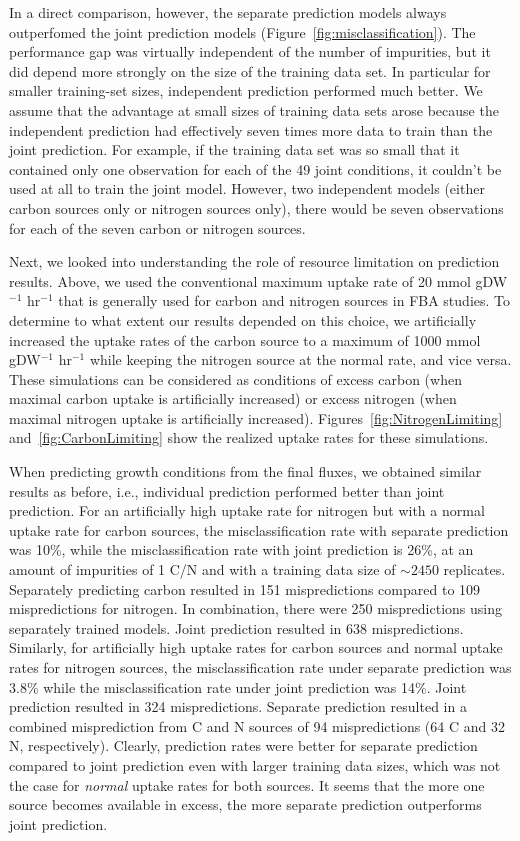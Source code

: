 \documentclass[12pt]{article}
\begin{document}
In a direct comparison, however, the separate prediction models always outperfomed the joint prediction models (Figure~\ref{fig:misclassification}). The performance gap was virtually independent of the number of impurities, but it did depend more strongly on the size of the training data set. In particular for smaller training-set sizes, independent prediction performed much better. We assume that the advantage at small sizes of training data sets arose because the independent prediction had effectively seven times more data to train than the joint prediction. For example, if the training data set was so small that it contained only one observation for each of the 49 joint conditions, it couldn't be used at all to train the joint model. However, two independent models (either carbon sources only or nitrogen sources only), there would be seven observations for each of the seven carbon or nitrogen sources.

Next, we looked into understanding the role of resource limitation on prediction results. Above, we used the conventional maximum uptake rate of 20 mmol gDW$^{-1}$ hr$^{-1}$ that is generally used for carbon and nitrogen sources in FBA studies. To determine to what extent our results depended on this choice, we artificially increased the uptake rates of the carbon source to a maximum of 1000 mmol gDW$^{-1}$ hr$^{-1}$ while keeping the nitrogen source at the normal rate, and vice versa. These simulations can be considered as conditions of excess carbon (when maximal carbon uptake is artificially increased) or excess nitrogen (when maximal nitrogen uptake is artificially increased). Figures~\ref{fig:NitrogenLimiting} and~\ref{fig:CarbonLimiting} show the realized uptake rates for these simulations.

When predicting growth conditions from the final fluxes, we obtained similar results as before, i.e., individual prediction performed better than joint prediction. For an artificially high uptake rate for nitrogen but with a normal uptake rate for carbon sources, the misclassification rate with separate prediction was 10\%, while the  misclassification rate with joint prediction is 26\%, at an amount of impurities of 1 C/N and with a training data size of $\mathord{\sim}2450$ replicates. Separately predicting carbon resulted in 151 mispredictions compared to 109 mispredictions for nitrogen. In combination, there were 250 mispredictions using separately trained models. Joint prediction resulted in 638 mispredictions. Similarly, for artificially high uptake rates for carbon sources and normal uptake rates for nitrogen sources, the misclassification rate under separate prediction was 3.8\% while the misclassification rate under joint prediction was 14\%. Joint prediction resulted in 324 mispredictions. Separate prediction resulted in a combined misprediction from C and N sources of 94 mispredictions (64 C and 32 N, respectively). Clearly, prediction rates were better for separate prediction compared to joint prediction even with larger training data sizes, which was not the case for \emph{normal} uptake rates for both sources. It seems that the more one source becomes available in excess, the more separate prediction outperforms joint prediction.
\end{document}
